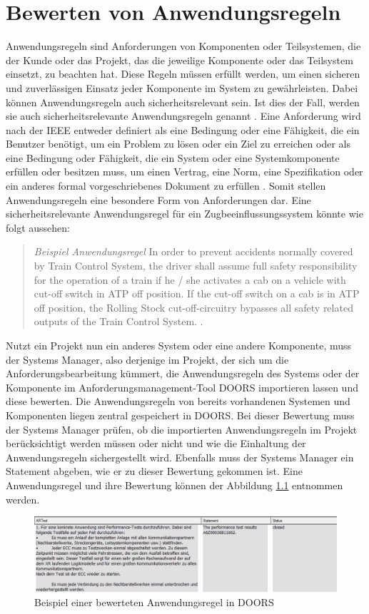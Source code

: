 \chapter{Bewerten von Anwendungsregeln}
\label{chap:kapitel2}

Anwendungsregeln sind Anforderungen von Komponenten oder Teilsystemen, die der Kunde oder das Projekt, das die jeweilige Komponente oder das Teilsystem einsetzt, zu beachten hat. 
Diese Regeln müssen erfüllt werden, um einen sicheren und zuverlässigen Einsatz jeder Komponente im System zu gewährleisten. 
Dabei können Anwendungsregeln auch sicherheitsrelevant sein. Ist dies der Fall, werden sie auch sicherheitsrelevante Anwendungsregeln genannt \cite[S.9]{q2}. Eine Anforderung wird nach der 
IEEE entweder definiert als eine Bedingung oder eine Fähigkeit, die ein Benutzer benötigt, um ein Problem zu lösen oder ein Ziel zu erreichen oder als eine Bedingung oder Fähigkeit, 
die ein System oder eine Systemkomponente erfüllen oder besitzen muss, um einen Vertrag, eine Norm, eine Spezifikation oder ein anderes formal vorgeschriebenes Dokument 
zu erfüllen \cite[S.62]{q4}. Somit stellen Anwendungsregeln eine besondere Form von Anforderungen dar. Eine sicherheitsrelevante Anwendungsregel 
für ein Zugbeeinflussungssystem könnte wie folgt aussehen:

\begin{quotation}
	\textit{Beispiel Anwendungsregel} \glqq In order to prevent accidents normally covered by Train Control System, the driver shall assume full safety responsibility for the operation of a train if he / she activates a cab on a vehicle 
    with cut-off switch in \glqq ATP off\grqq{} position. If the cut-off switch on a cab is in \glqq ATP off\grqq{} position, the Rolling Stock cut-off-circuitry bypasses all safety related outputs of the 
    Train Control System.\grqq{} \cite[S.7]{q1}.
\end{quotation}

Nutzt ein Projekt nun ein anderes System oder eine andere Komponente, muss der Systems Manager, also derjenige im Projekt, der sich um die Anforderungsbearbeitung kümmert, 
die Anwendungsregeln des Systems oder der Komponente im Anforderungsmanagement-Tool \acs*{DOORS} importieren lassen und diese bewerten. Die Anwendungsregeln von bereits vorhandenen Systemen 
und Komponenten liegen zentral gespeichert in \acs{DOORS}. Bei dieser Bewertung muss der Systems Manager prüfen, ob die importierten Anwendungsregeln im Projekt berücksichtigt 
werden müssen oder nicht und wie die Einhaltung der Anwendungsregeln sichergestellt wird. Ebenfalls muss der Systems Manager ein Statement abgeben, wie er zu dieser Bewertung gekommen ist. 
Eine Anwendungsregel und ihre Bewertung können der Abbildung \ref*{fig:Bewertete Anwendungsregel} entnommen werden.

\begin{figure}[h]
    \centering
    \includegraphics[width = \textwidth]{abbildungen/Bewertete Anwendungsregel.PNG}
    \caption{Beispiel einer bewerteten Anwendungsregel in \acs{DOORS}}
    \label{fig:Bewertete Anwendungsregel}
\end{figure}